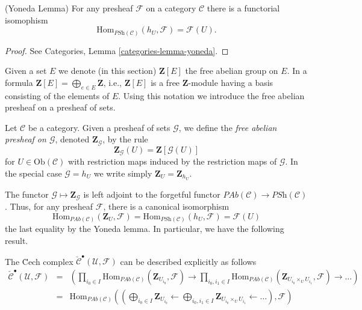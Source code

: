 \begin{lemma}
\label{lemma-yoneda-presheaf}
(Yoneda Lemma)
For any presheaf $\mathcal{F}$ on a category $\mathcal{C}$ there is a
functorial isomophism
$$
\text{Hom}_{\textit{PSh}(\mathcal{C})}(h_U, \mathcal{F}) =
\mathcal{F}(U).
$$
\end{lemma}

\begin{proof}
See Categories, Lemma \ref{categories-lemma-yoneda}.
\end{proof}

\noindent
Given a set $E$ we denote (in this section)
$\mathbf{Z}[E]$ the free abelian group on $E$. In a formula
$\mathbf{Z}[E] = \bigoplus_{e \in E} \mathbf{Z}$, i.e., $\mathbf{Z}[E]$ is
a free $\mathbf{Z}$-module having a basis consisting of the elements of $E$.
Using this notation we introduce the free abelian presheaf on a
presheaf of sets.

\begin{definition}
\label{definition-free-abelian-presheaf}
Let $\mathcal{C}$ be a category.
Given a presheaf of sets $\mathcal{G}$, we define the
{\it free abelian presheaf on $\mathcal{G}$},
denoted $\mathbf{Z}_{\mathcal{G}}$, by the rule
$$
\mathbf{Z}_{\mathcal{G}}(U)
=
\mathbf{Z}[\mathcal{G}(U)]
$$
for $U \in \text{Ob}(\mathcal{C})$
with restriction maps induced by the restriction maps of $\mathcal{G}$.
In the special case $\mathcal{G} = h_U$ we write simply
$\mathbf{Z}_U = \mathbf{Z}_{h_U}$.
\end{definition}

\noindent
The functor $\mathcal{G} \mapsto \mathbf{Z}_\mathcal{G}$ is left adjoint to the
forgetful functor $\textit{PAb}(\mathcal{C}) \to \textit{PSh}(\mathcal{C})$.
Thus, for any presheaf $\mathcal{F}$, there is a canonical isomorphism
$$
\text{Hom}_{\textit{PAb}(\mathcal{C})}(\mathbf{Z}_U, \mathcal{F})
=
\text{Hom}_{\textit{PSh}(\mathcal{C})}(h_U, \mathcal{F})
=
\mathcal{F}(U)
$$
the last equality by the Yoneda lemma. In particular, we have the following
result.

\begin{lemma}
\label{lemma-cech-complex-describe}
The \u Cech complex $\check{\mathcal{C}}^\bullet(\mathcal{U}, \mathcal{F})$
can be described explicitly as follows
\begin{eqnarray*}
\check{\mathcal{C}}^\bullet(\mathcal{U}, \mathcal{F})
& = &
\left(
\prod_{i_0 \in I}
\text{Hom}_{\textit{PAb}(\mathcal{C})}(\mathbf{Z}_{U_{i_0}}, \mathcal{F}) \to
\prod_{i_0, i_1 \in I}
\text{Hom}_{\textit{PAb}(\mathcal{C})}(
\mathbf{Z}_{U_{i_0} \times_U U_{i_1}}, \mathcal{F}) \to \ldots
\right) \\
& = &
\text{Hom}_{\textit{PAb}(\mathcal{C})}\left(
\left(
\displaystyle
\bigoplus_{i_0 \in I} \mathbf{Z}_{U_{i_0}} \leftarrow
\bigoplus_{i_0, i_1 \in I} \mathbf{Z}_{U_{i_0}\times_U U_{i_1}} \leftarrow
\ldots
\right), \mathcal{F}\right)
\end{eqnarray*}
\end{lemma}

